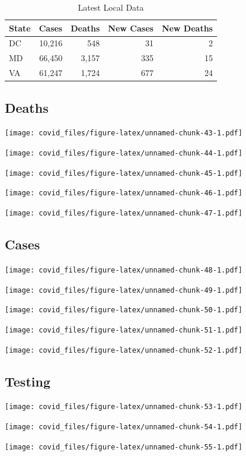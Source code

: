 \documentclass[]{article}
\begin{document}
\begin{table}[!h]

\caption{\label{tab:unnamed-chunk-42}Latest Local Data}
\centering
\begin{tabular}{l|r|r|r|r}
\hline
State & Cases & Deaths & New Cases & New Deaths\\
\hline
DC & 10,216 & 548 & 31 & 2\\
\hline
MD & 66,450 & 3,157 & 335 & 15\\
\hline
VA & 61,247 & 1,724 & 677 & 24\\
\hline
\end{tabular}
\end{table}

\newpage

\hypertarget{deaths-2}{%
\subsection{Deaths}\label{deaths-2}}

\texttt{[image: covid\_files/figure-latex/unnamed-chunk-43-1.pdf]}

\texttt{[image: covid\_files/figure-latex/unnamed-chunk-44-1.pdf]}

\texttt{[image: covid\_files/figure-latex/unnamed-chunk-45-1.pdf]}

\texttt{[image: covid\_files/figure-latex/unnamed-chunk-46-1.pdf]}

\texttt{[image: covid\_files/figure-latex/unnamed-chunk-47-1.pdf]}

\newpage

\hypertarget{cases-2}{%
\subsection{Cases}\label{cases-2}}

\texttt{[image: covid\_files/figure-latex/unnamed-chunk-48-1.pdf]}

\texttt{[image: covid\_files/figure-latex/unnamed-chunk-49-1.pdf]}

\texttt{[image: covid\_files/figure-latex/unnamed-chunk-50-1.pdf]}

\texttt{[image: covid\_files/figure-latex/unnamed-chunk-51-1.pdf]}

\texttt{[image: covid\_files/figure-latex/unnamed-chunk-52-1.pdf]}

\newpage

\hypertarget{testing-2}{%
\subsection{Testing}\label{testing-2}}

\texttt{[image: covid\_files/figure-latex/unnamed-chunk-53-1.pdf]}

\texttt{[image: covid\_files/figure-latex/unnamed-chunk-54-1.pdf]}

\texttt{[image: covid\_files/figure-latex/unnamed-chunk-55-1.pdf]}
\end{document}
